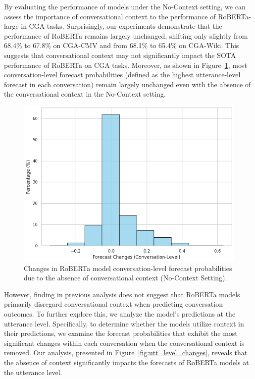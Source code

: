 %
By evaluating the performance of models under the No-Context setting, we can assess the importance of conversational context to the performance of RoBERTa-large in CGA tasks. 
%
Surprisingly, our experiments demonstrate that the performance of RoBERTa remains largely unchanged, shifting only slightly from 68.4\% to 67.8\% on CGA-CMV and from 68.1\% to 65.4\% on CGA-Wiki. 
%
This suggests that conversational context may not significantly impact the SOTA performance of RoBERTa on CGA tasks.
%
Moreover, as shown in Figure~\ref{fig:convo_level_changes}, most conversation-level forecast probabilities (defined as the highest utterance-level forecast in each conversation) remain largely unchanged even with the absence of the conversational context in the No-Context setting.
\begin{figure}[ht]
    \centering
    \includegraphics[width=\linewidth]{figures/convo_level_changes.png}
    \caption{
        Changes in RoBERTa model conversation-level forecast probabilities due to the absence of conversational context (No-Context Setting).}
    \label{fig:convo_level_changes}
\end{figure}
However, finding in previous analysis does not suggest that RoBERTa models primarily disregard conversational context when predicting conversation outcomes. 
%
To further explore this, we analyze the model's predictions at the utterance level. 
%
Specifically, to determine whether the models utilize context in their predictions, we examine the forecast probabilities that exhibit the most significant changes within each conversation when the conversational context is removed. 
%
Our analysis, presented in Figure~\ref{fig:utt_level_changes}, reveals that the absence of context significantly impacts the forecasts of RoBERTa models at the utterance level.

